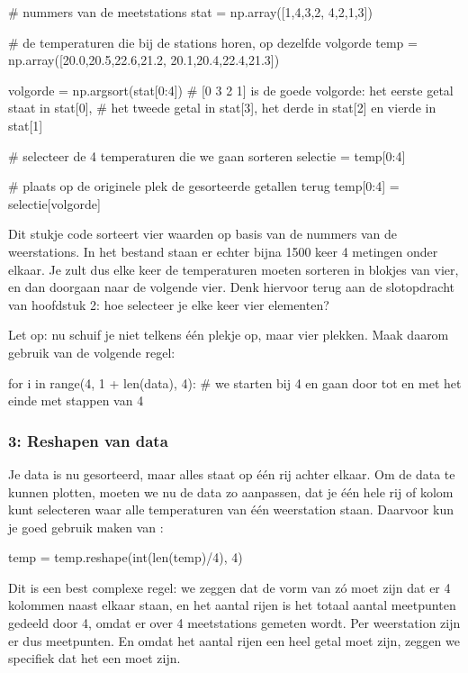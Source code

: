 \documentclass[a4paper,11pt, fleqn]{article}
\begin{document}
\begin{python}
# nummers van de meetstations
stat = np.array([1,4,3,2, 4,2,1,3])

# de temperaturen die bij de stations horen, op dezelfde volgorde
temp = np.array([20.0,20.5,22.6,21.2, 20.1,20.4,22.4,21.3])

volgorde = np.argsort(stat[0:4])
# [0 3 2 1] is de goede volgorde: het eerste getal staat in stat[0],
# het tweede getal in stat[3], het derde in stat[2] en vierde in stat[1]

# selecteer de 4 temperaturen die we gaan sorteren
selectie = temp[0:4]

# plaats op de originele plek de gesorteerde getallen terug
temp[0:4] = selectie[volgorde]
\end{python}

Dit stukje code sorteert vier waarden op basis van de nummers van de weerstations. In het bestand staan er echter bijna 1500 keer 4 metingen onder elkaar. Je zult dus elke keer de temperaturen moeten sorteren in blokjes van vier, en dan doorgaan naar de volgende vier. Denk hiervoor terug aan de slotopdracht van hoofdstuk 2: hoe selecteer je elke keer vier elementen?

Let op: nu schuif je niet telkens één plekje op, maar vier plekken. Maak daarom gebruik van de volgende regel:

\begin{python}
for i in range(4, 1 + len(data), 4):
# we starten bij 4 en gaan door tot en met het einde met stappen van 4
\end{python}

\subsubsection*{3: Reshapen van data}
Je data is nu gesorteerd, maar alles staat op \'e\'en rij achter elkaar. Om de data te kunnen plotten, moeten we nu de data zo aanpassen, dat je \'e\'en hele rij of kolom kunt selecteren waar alle temperaturen van \'e\'en weerstation staan. Daarvoor kun je goed gebruik maken van :

\begin{python}
temp = temp.reshape(int(len(temp)/4), 4)
\end{python}

Dit is een best complexe regel: we zeggen dat de vorm van  z\'o moet zijn dat er 4 kolommen naast elkaar staan, en het aantal rijen is het totaal aantal meetpunten gedeeld door 4, omdat er over 4 meetstations gemeten wordt. Per weerstation zijn er dus  meetpunten. En omdat het aantal rijen een heel getal moet zijn, zeggen we specifiek dat het een  moet zijn.
\end{document}
